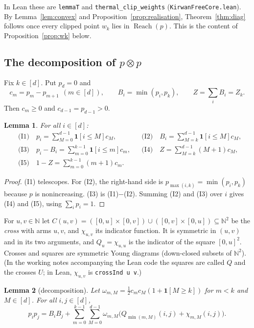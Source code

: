 \documentclass[11pt]{amsart}
\newtheorem{lemma}{Lemma}[section]
\theoremstyle{definition}
\theoremstyle{remark}
\numberwithin{equation}{section}
\newcommand{\N}{\mathbb{N}}
\newcommand{\Reach}{\operatorname{Reach}}
\newcommand{\ind}[1]{\mathbf{1}[#1]}
\newcommand{\lean}[1]{\texttt{#1}}
\begin{document}
In Lean these are \lean{lemmaT} and \lean{thermal\_clip\_weights} (\lean{KirwanFreeCore.lean}).
By Lemma~\ref{lem:convex} and Proposition~\ref{prop:realisation}, Theorem~\ref{thm:diag} follows once
every clipped point $w_k$ lies in $\Reach(p)$. This is the content of Proposition~\ref{prop:wk} below.

\subsection{The decomposition of \texorpdfstring{$p\otimes p$}{p x p}}
Fix $k\in[d]$. Put $p_d=0$ and
\[
  c_m=p_m-p_{m+1}\ \ (m\in[d]),\qquad B_i=\min(p_i,p_k),\qquad Z=\sum_iB_i=Z_k .
\]
Then $c_m\ge0$ and $c_{d-1}=p_{d-1}>0$.

\begin{lemma}\label{lem:telescope}
For all $i\in[d]$:
\begin{align*}
&\text{(I1)}\quad p_i=\sum_{M=0}^{d-1}\ind{i\le M}c_M, &&\text{(I2)}\quad B_i=\sum_{M=k}^{d-1}\ind{i\le M}c_M,\\
&\text{(I3)}\quad p_i-B_i=\sum_{m=0}^{k-1}\ind{i\le m}c_m, &&\text{(I4)}\quad Z=\sum_{M=k}^{d-1}(M+1)c_M,\\
&\text{(I5)}\quad 1-Z=\sum_{m=0}^{k-1}(m+1)c_m .
\end{align*}
\end{lemma}

\begin{proof}
(I1) telescopes. For (I2), the right-hand side is $p_{\max(i,k)}=\min(p_i,p_k)$ because $p$ is
nonincreasing. (I3) is (I1)$-$(I2). Summing (I2) and (I3) over $i$ gives (I4) and (I5), using
$\sum_ip_i=1$.
\end{proof}

For $u,v\in\N$ let $C(u,v)=([0,u]\times[0,v])\cup([0,v]\times[0,u])\subseteq\N^2$ be the \emph{cross}
with arms $u,v$, and $\chi_{u,v}$ its indicator function. It is symmetric in $(u,v)$ and in its two
arguments, and $Q_u=\chi_{u,u}$ is the indicator of the square $[0,u]^2$. Crosses and squares are
symmetric Young diagrams (down-closed subsets of $\N^2$). (In the working notes accompanying the Lean
code the squares are called $Q$ and the crosses $U$; in Lean, $\chi_{u,v}$ is \lean{crossInd u v}.)

\begin{lemma}[decomposition]\label{lem:decomp}
Let $\omega_{m,M}=\tfrac12c_mc_M(1+\ind{M\ge k})$ for $m<k$ and $M\in[d]$. For all $i,j\in[d]$,
\[
  p_ip_j=B_iB_j+\sum_{m=0}^{k-1}\sum_{M=0}^{d-1}\omega_{m,M}\bigl(Q_{\min(m,M)}(i,j)+\chi_{m,M}(i,j)\bigr) .
\]
\end{lemma}
\end{document}
